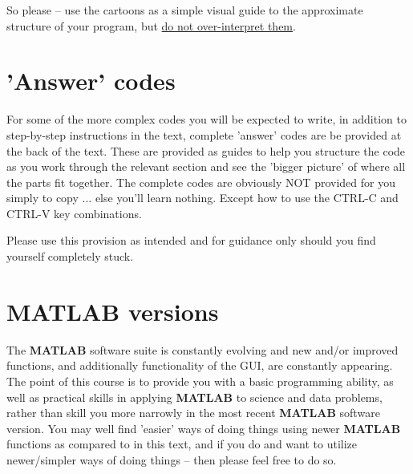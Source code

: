 \documentclass{tufte-book} %
\begin{document}
So please -- use the cartoons as a simple visual guide to the approximate structure of your program, but \uline{do not over-interpret them}.


\section{'Answer' codes}

For some of the more complex codes you will be expected to write, in addition to step-by-step instructions in the text, complete 'answer' codes are be provided at the back of the text. These are provided as guides to help you structure the code as you work through the relevant section and see the 'bigger picture' of where all the parts fit together. The complete codes are obviously NOT provided for you simply to copy ... else you'll learn nothing. Except how to use the \textsf{CTRL-C} and \textsf{CTRL-V} key combinations.

Please use this provision as intended and for guidance only should you find yourself completely stuck.


\section{\textbf{MATLAB} versions}

The \textbf{MATLAB} software suite is constantly evolving and new and/or improved functions, and additionally functionality of the GUI, are constantly appearing. The point of this course is to provide you with a basic programming ability, as well as practical skills in applying \textbf{MATLAB} to science and data problems, rather than skill you more narrowly in the most recent \textbf{MATLAB} software version. You may well find 'easier' ways of doing things using newer \textbf{MATLAB} functions as compared to in this text, and if you do and want to utilize newer/simpler ways of doing things -- then please feel free to do so.


\mainmatter

\end{document}
